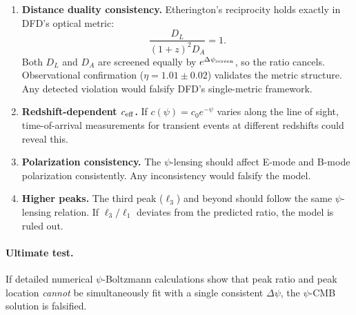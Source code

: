 \begin{enumerate}
\item \textbf{Distance duality consistency.}
Etherington's reciprocity holds exactly in DFD's optical metric:
\begin{equation}
\frac{D_L}{(1+z)^2 D_A} = 1.
\end{equation}
Both $D_L$ and $D_A$ are screened equally by $e^{\Delta\psi_{\rm screen}}$, so the ratio cancels. Observational confirmation ($\eta = 1.01 \pm 0.02$) validates the metric structure. Any detected violation would falsify DFD's single-metric framework.

\item \textbf{Redshift-dependent $c_{\rm eff}$.}
If $c(\psi) = c_0 e^{-\psi}$ varies along the line of sight, time-of-arrival measurements for transient events at different redshifts could reveal this.

\item \textbf{Polarization consistency.}
The $\psi$-lensing should affect E-mode and B-mode polarization consistently. Any inconsistency would falsify the model.

\item \textbf{Higher peaks.}
The third peak ($\ell_3$) and beyond should follow the same $\psi$-lensing relation. If $\ell_3/\ell_1$ deviates from the predicted ratio, the model is ruled out.
\end{enumerate}

\paragraph{Ultimate test.}
If detailed numerical $\psi$-Boltzmann calculations show that peak ratio and peak location \textit{cannot} be simultaneously fit with a single consistent $\Delta\psi$, the $\psi$-CMB solution is falsified.
